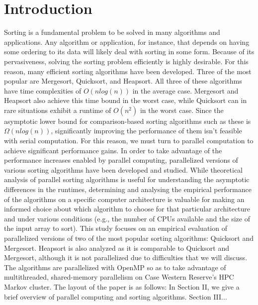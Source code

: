 \documentclass[conference]{IEEEtran}
\begin{document}
    \section{Introduction}
    Sorting is a fundamental problem to be solved in many algorithms and applications.
    Any algorithm or application, for instance, that depends on having some ordering to its data will likely deal with sorting in some form. Because of its pervasiveness, solving the sorting problem efficiently is highly desirable. For this reason, many efficient sorting algorithms have been developed. Three of the most popular are Mergesort, Quicksort, and Heapsort. All three of these algorithms have time complexities of $O(nlog(n))$ in the average case. Mergesort and Heapsort also achieve this time bound in the worst case, while Quicksort can in rare situations exhibit a runtime of $O(n^2)$ in the worst case. Since the asymptotic lower bound for comparison-based sorting algorithms such as these is $\Omega(nlog(n))$, significantly improving the performance of them isn't feasible with serial computation. For this reason, we must turn to parallel computation to achieve significant performance gains. In order to take advantage of the performance increases enabled by parallel computing, parallelized versions of various sorting algorithms have been developed and studied. While theoretical analysis of parallel sorting algorithms is useful for understanding the asymptotic differences in the runtimes, determining and analysing the empirical performance of the algorithms on a specific computer architecture is valuable for making an informed choice about which algorithm to choose for that particular architecture and under various conditions (e.g., the number of CPUs available and the size of the input array to sort).
    This study focuses on an empirical evaluation of parallelized versions of two of the most popular sorting algorithms: Quicksort and Mergesort. Heapsort is also analyzed as it is comparable to Quicksort and Mergesort, although it is not parallelized due to difficulties that we will discuss. The algorithms are parallelized with OpenMP so as to take advantage of multithreaded, shared-memory parallelism on Case Western Reserve's HPC Markov cluster.
    The layout of the paper is as follows: In Section II, we give a brief overview of parallel computing and sorting algorithms. Section III...
    
\end{document}
